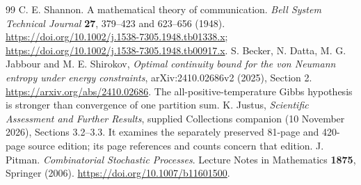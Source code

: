 \documentclass[11pt,a4paper]{article}
\begin{document}
\begin{thebibliography}{99}
C. E. Shannon. A mathematical theory of communication.
\emph{Bell System Technical Journal} \textbf{27}, 379--423 and 623--656 (1948).
\url{https://doi.org/10.1002/j.1538-7305.1948.tb01338.x};
\url{https://doi.org/10.1002/j.1538-7305.1948.tb00917.x}.
 S. Becker, N. Datta, M. G. Jabbour and M. E. Shirokov, \emph{Optimal continuity bound for the von Neumann entropy under energy constraints}, arXiv:2410.02686v2 (2025), Section 2. \url{https://arxiv.org/abs/2410.02686}. The all-positive-temperature Gibbs hypothesis is stronger than convergence of one partition sum.
 K. Justus, \emph{Scientific Assessment and Further Results}, supplied Collections companion (10 November 2026), Sections 3.2--3.3. It examines the separately preserved 81-page and 420-page source edition; its page references and counts concern that edition.
J. Pitman. \emph{Combinatorial Stochastic Processes}.
Lecture Notes in Mathematics \textbf{1875}, Springer (2006).
\url{https://doi.org/10.1007/b11601500}.
\end{thebibliography}
\end{document}
